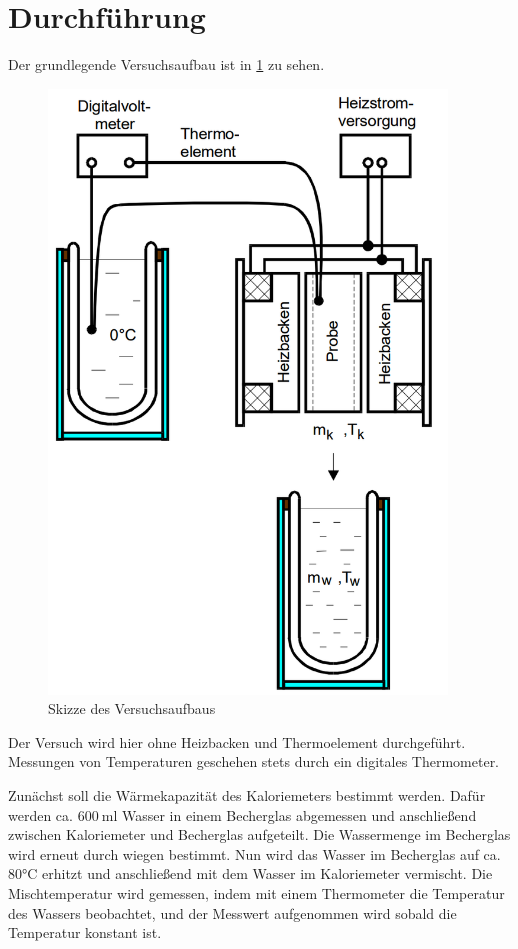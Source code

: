 \section{Durchführung}
\label{sec:Durchführung}
Der grundlegende Versuchsaufbau ist in \ref{fig:aufbau} zu sehen.

\begin{figure}
  \centering
  \includegraphics[width=300pt]{data/aufbau.png}
  \caption{Skizze des Versuchsaufbaus \cite{Versuchsanleitung}}
  \label{fig:aufbau}
\end{figure}

Der Versuch wird hier ohne Heizbacken und Thermoelement durchgeführt. Messungen
von Temperaturen geschehen stets durch ein digitales Thermometer.

Zunächst soll die Wärmekapazität des Kaloriemeters bestimmt werden. Dafür werden ca.
$\SI{600}{\milli\litre}$ Wasser in einem Becherglas abgemessen und anschließend zwischen Kaloriemeter
und Becherglas aufgeteilt. Die Wassermenge im Becherglas wird erneut durch wiegen
bestimmt. Nun wird das Wasser im Becherglas auf ca. 80°C erhitzt und anschließend
mit dem Wasser im Kaloriemeter vermischt. Die Mischtemperatur wird gemessen, indem
mit einem Thermometer die Temperatur des Wassers beobachtet, und der Messwert aufgenommen
wird sobald die Temperatur konstant ist.

